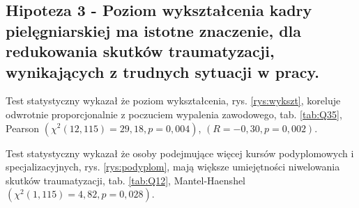 \documentclass[a4paper,12pt,twoside,openright]{mwrep}
\begin{document}


	

	
	
	





%

%



\subsection*{Hipoteza 3 - Poziom wykształcenia kadry pielęgniarskiej ma istotne znaczenie, dla redukowania skutków traumatyzacji, wynikających z trudnych sytuacji w pracy.}





	Test statystyczny wykazał że poziom wykształcenia, rys. \ref{rys:wykszt}, koreluje odwrotnie proporcjonalnie z poczuciem wypalenia zawodowego, tab. \ref{tab:Q35}, Pearson $(\chi^2 (12, 115) = 29,18, p=0,004)$, $(R = -0,30, p = 0,002)$. 
		
	Test statystyczny wykazał że osoby podejmujące więcej kursów podyplomowych i specjalizacyjnych, rys. \ref{rys:podyplom}, mają większe umiejętności niwelowania skutków traumatyzacji, tab. \ref{tab:Q12}, Mantel-Haenshel $(\chi^2 (1, 115) = 4,82, p=0,028)$. 
\end{document}
